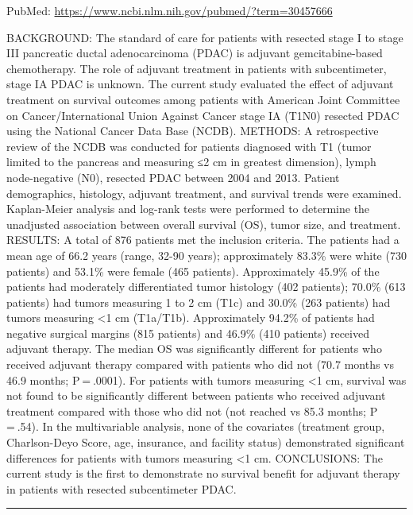 \documentclass[]{article}
\begin{document}
PubMed: \url{https://www.ncbi.nlm.nih.gov/pubmed/?term=30457666}

BACKGROUND: The standard of care for patients with resected stage I to
stage III pancreatic ductal adenocarcinoma (PDAC) is adjuvant
gemcitabine-based chemotherapy. The role of adjuvant treatment in
patients with subcentimeter, stage IA PDAC is unknown. The current study
evaluated the effect of adjuvant treatment on survival outcomes among
patients with American Joint Committee on Cancer/International Union
Against Cancer stage IA (T1N0) resected PDAC using the National Cancer
Data Base (NCDB). METHODS: A retrospective review of the NCDB was
conducted for patients diagnosed with T1 (tumor limited to the pancreas
and measuring ≤2 cm in greatest dimension), lymph node-negative (N0),
resected PDAC between 2004 and 2013. Patient demographics, histology,
adjuvant treatment, and survival trends were examined. Kaplan-Meier
analysis and log-rank tests were performed to determine the unadjusted
association between overall survival (OS), tumor size, and treatment.
RESULTS: A total of 876 patients met the inclusion criteria. The
patients had a mean age of 66.2 years (range, 32-90 years);
approximately 83.3\% were white (730 patients) and 53.1\% were female
(465 patients). Approximately 45.9\% of the patients had moderately
differentiated tumor histology (402 patients); 70.0\% (613 patients) had
tumors measuring 1 to 2 cm (T1c) and 30.0\% (263 patients) had tumors
measuring \textless{}1 cm (T1a/T1b). Approximately 94.2\% of patients
had negative surgical margins (815 patients) and 46.9\% (410 patients)
received adjuvant therapy. The median OS was significantly different for
patients who received adjuvant therapy compared with patients who did
not (70.7 months vs 46.9 months; P = .0001). For patients with tumors
measuring \textless{}1 cm, survival was not found to be significantly
different between patients who received adjuvant treatment compared with
those who did not (not reached vs 85.3 months; P = .54). In the
multivariable analysis, none of the covariates (treatment group,
Charlson-Deyo Score, age, insurance, and facility status) demonstrated
significant differences for patients with tumors measuring \textless{}1
cm. CONCLUSIONS: The current study is the first to demonstrate no
survival benefit for adjuvant therapy in patients with resected
subcentimeter PDAC.

{}

{}

\begin{center}\rule{0.5\linewidth}{\linethickness}\end{center}
\end{document}
